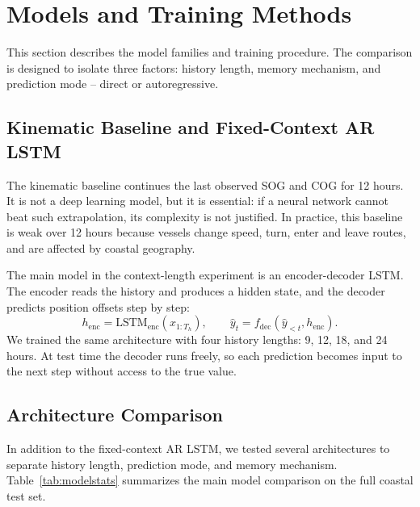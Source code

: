 \section{Models and Training Methods}
This section describes the model families and training procedure. The comparison is designed to isolate three factors: history length, memory mechanism, and prediction mode -- direct or autoregressive.

\subsection{Kinematic Baseline and Fixed-Context AR LSTM}
The kinematic baseline continues the last observed SOG and COG for 12 hours. It is not a deep learning model, but it is essential: if a neural network cannot beat such extrapolation, its complexity is not justified. In practice, this baseline is weak over 12 hours because vessels change speed, turn, enter and leave routes, and are affected by coastal geography.

The main model in the context-length experiment is an encoder-decoder LSTM. The encoder reads the history and produces a hidden state, and the decoder predicts position offsets step by step:
\[
 h_{\mathrm{enc}}=\mathrm{LSTM}_{\mathrm{enc}}(x_{1:T_h}),\qquad
 \hat{y}_t=f_{\mathrm{dec}}(\hat{y}_{<t},h_{\mathrm{enc}}).
\]
We trained the same architecture with four history lengths: 9, 12, 18, and 24 hours. At test time the decoder runs freely, so each prediction becomes input to the next step without access to the true value.

\subsection{Architecture Comparison}
In addition to the fixed-context AR LSTM, we tested several architectures to separate history length, prediction mode, and memory mechanism. Table~\ref{tab:modelstats} summarizes the main model comparison on the full coastal test set.

